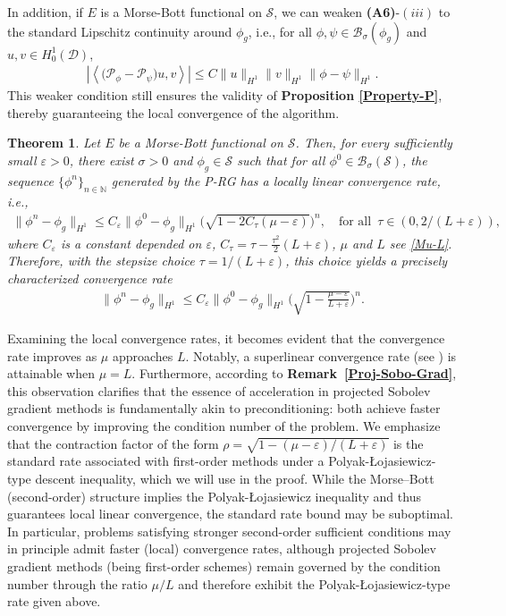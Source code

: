 \documentclass[preprint,3p]{elsarticle}
\newtheorem{thm}{Theorem}[section]
\begin{document}
In addition, if $E$ is a Morse-Bott functional on $\mathcal{S}$, we can weaken {\bf (A6)}-$(iii)$ to the standard Lipschitz continuity around $\phi_g$, i.e., for all $\phi, \psi \in\mathcal{B}_{\sigma}(\phi_g)$ and $u, v\in H_0^1(\mathcal{D})$,
\begin{align}\label{weaker-A6-iii}
	\left|\left\langle \big(\mathcal{P}_{\phi}-\mathcal{P}_{\psi}\big)u,v\right\rangle\right|\le C\|u\|_{H^1}\|v\|_{H^1}\|\phi-\psi\|_{H^1}.
\end{align}
This weaker condition still ensures the validity of {\bf Proposition \ref{Property-P}}, thereby guaranteeing the local convergence of the algorithm.

\begin{thm}\label{Local-Convergence}
	Let $E$ be a Morse-Bott functional on $\mathcal{S}$. Then, for every sufficiently small $\varepsilon>0$, there exist $\sigma>0$ and $\phi_g \in \mathcal{S}$ such that for all $\phi^0 \in \mathcal{B}_{\sigma}(\mathcal{S})$, the sequence $\{\phi^n\}_{n\in\mathbb{N}}$ generated by the P-RG has a locally linear convergence rate, i.e.,
	\begin{align*}
		\|\phi^n-\phi_g\|_{H^1}\le C_{\varepsilon}\|\phi^0-\phi_g\|_{H^1}\big(\sqrt{1-2C_{\tau}(\mu-\varepsilon)}\big)^n,\quad {\text{for all}}\;\ \tau\in(0,2/(L+\varepsilon)),
	\end{align*}
	where $C_{\varepsilon}$ is a constant depended on $\varepsilon$, $C_{\tau}=\tau-\frac{\tau^2}{2}(L+\varepsilon)$, $\mu$ and $L$ see \eqref{Mu-L}.
	Therefore, with the stepsize choice $\tau=1/(L+\varepsilon)$, this choice yields a precisely characterized convergence rate
	\begin{align}\label{Rate-1}
		\|\phi^n-\phi_g\|_{H^1}\le C_{\varepsilon}\|\phi^0-\phi_g\|_{H^1}\Bigg(\sqrt{1-\frac{\mu-\varepsilon}{L+\varepsilon}}\Bigg)^n.
	\end{align}
	
\end{thm}
Examining the local convergence rates, it becomes evident that the convergence rate improves as $\mu$ approaches $L$. Notably, a superlinear convergence rate (see \cite{2006Numerical}) is attainable when $\mu = L$. Furthermore, according to {\bf Remark~\ref{Proj-Sobo-Grad}}, this observation clarifies that the essence of acceleration in projected Sobolev gradient methods is fundamentally akin to preconditioning: both achieve faster convergence by improving the condition number of the problem. {We emphasize that the contraction factor of the form $\rho=\sqrt{1-(\mu-\varepsilon)/(L+\varepsilon)}$ is the standard rate associated with first-order methods under a Polyak-\L ojasiewicz-type descent
inequality, which we will use in the proof. While the Morse–Bott (second-order) structure implies the Polyak-\L ojasiewicz inequality and thus guarantees local linear convergence, the standard rate bound may be suboptimal. In particular, problems satisfying stronger second-order sufficient conditions may in principle admit faster (local) convergence rates, although projected Sobolev gradient methods (being first-order schemes) remain governed by the condition number through the ratio $\mu/L$ and therefore exhibit the Polyak-\L ojasiewicz-type rate given above.}
\end{document}
